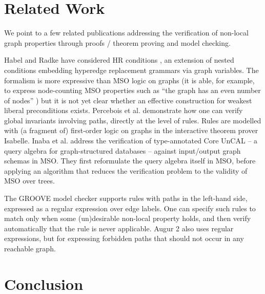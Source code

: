 \documentclass{llncs}
\begin{document}
	











	
	\section{Related Work}\label{sec:related_work}
	
	We point to a few related publications addressing the verification of non-local graph properties through proofs / theorem proving and model checking.
	
	Habel and Radke have considered HR conditions \cite{Habel-Radke10a}, an extension of nested conditions embedding hyperedge replacement grammars via graph variables. The formalism is more expressive than MSO logic on graphs (it is able, for example, to express node-counting MSO properties such as ``the graph has an even number of nodes'' \cite{Radke13a}) but it is not yet clear whether an effective construction for weakest liberal preconditions exists. Percebois et al. \cite{Percebois-Strecker-Tran13a} demonstrate how one can verify global invariants involving paths, directly at the level of rules. Rules are modelled with (a fragment of) first-order logic on graphs in the interactive theorem prover Isabelle. Inaba et al. \cite{Inaba-et-al11a} address the verification of type-annotated Core UnCAL -- a query algebra for graph-structured databases -- against input/output graph schemas in MSO. They first reformulate the query algebra itself in MSO, before applying an algorithm that reduces the verification problem to the validity of MSO over trees.
	
	The GROOVE model checker \cite{Ghamarian-Mol-Rensink-Zambon-Zimakova12a} supports rules with paths in the left-hand side, expressed as a regular expression over edge labels. One can specify such rules to match only when some (un)desirable non-local property holds, and then verify automatically that the rule is never applicable. Augur 2 \cite{Koenig-Kozioura08a} also uses regular expressions, but for expressing forbidden paths that should not occur in any reachable graph.
	
	\section{Conclusion}\label{sec:conclusion}
	
\end{document}
